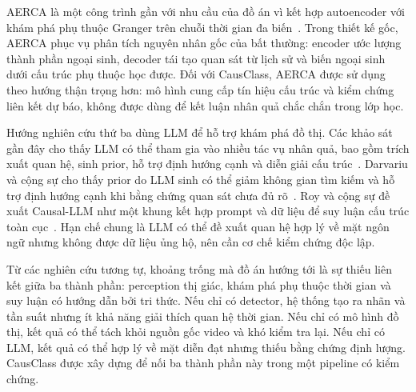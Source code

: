 AERCA là một công trình gần với nhu cầu của đồ án vì kết hợp autoencoder với khám phá phụ thuộc Granger trên chuỗi thời gian đa biến \,\cite{han2025aerca}. Trong thiết kế gốc, AERCA phục vụ phân tích nguyên nhân gốc của bất thường: encoder ước lượng thành phần ngoại sinh, decoder tái tạo quan sát từ lịch sử và biến ngoại sinh dưới cấu trúc phụ thuộc học được. Đối với CausClass, AERCA được sử dụng theo hướng thận trọng hơn: mô hình cung cấp tín hiệu cấu trúc và kiểm chứng liên kết dự báo, không được dùng để kết luận nhân quả chắc chắn trong lớp học.

Hướng nghiên cứu thứ ba dùng LLM để hỗ trợ khám phá đồ thị. Các khảo sát gần đây cho thấy LLM có thể tham gia vào nhiều tác vụ nhân quả, bao gồm trích xuất quan hệ, sinh prior, hỗ trợ định hướng cạnh và diễn giải cấu trúc \,\cite{wan2024llmcausal,ma2025llmcausal}. Darvariu và cộng sự cho thấy prior do LLM sinh có thể giảm không gian tìm kiếm và hỗ trợ định hướng cạnh khi bằng chứng quan sát chưa đủ rõ \,\cite{darvariu2024llmpriors}. Roy và cộng sự đề xuất Causal-LLM như một khung kết hợp prompt và dữ liệu để suy luận cấu trúc toàn cục \,\cite{roy2025causalllm}. Hạn chế chung là LLM có thể đề xuất quan hệ hợp lý về mặt ngôn ngữ nhưng không được dữ liệu ủng hộ, nên cần cơ chế kiểm chứng độc lập.

Từ các nghiên cứu tương tự, khoảng trống mà đồ án hướng tới là sự thiếu liên kết giữa ba thành phần: perception thị giác, khám phá phụ thuộc thời gian và suy luận có hướng dẫn bởi tri thức. Nếu chỉ có detector, hệ thống tạo ra nhãn và tần suất nhưng ít khả năng giải thích quan hệ thời gian. Nếu chỉ có mô hình đồ thị, kết quả có thể tách khỏi nguồn gốc video và khó kiểm tra lại. Nếu chỉ có LLM, kết quả có thể hợp lý về mặt diễn đạt nhưng thiếu bằng chứng định lượng. CausClass được xây dựng để nối ba thành phần này trong một pipeline có kiểm chứng.